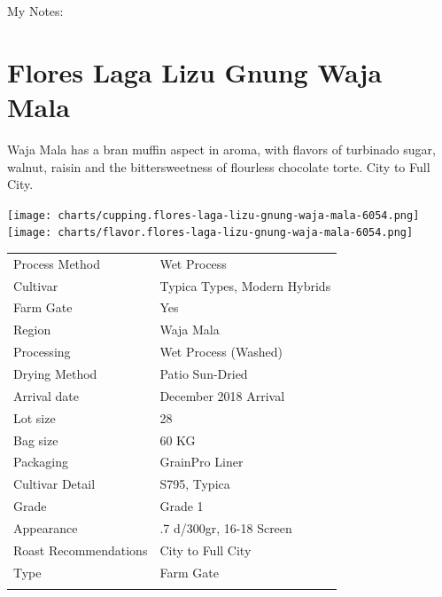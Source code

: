 \documentclass[10pt,twoside,footinclude=true,headinclude=true]{scrbook} %
\newlength{\mysize}
\newcommand{\myfontsize}[1]{
  \setlength{\mysize}{#1pt}
  \fontsize{\mysize}{1.2\mysize}
  \selectfont
}
\begin{document}
\medskip
\normalsize
My Notes:


\chapter*{Flores Laga Lizu Gnung Waja Mala}
 
\begin{addmargin}[2.2em]{2.2em}
\small
\justify
Waja Mala has a bran muffin aspect in aroma, with flavors of turbinado sugar, walnut, raisin and the bittersweetness of flourless chocolate torte. City to Full City.
\end{addmargin}

\centering
\vspace{2em}
\texttt{[image: charts/cupping.flores-laga-lizu-gnung-waja-mala-6054.png]}
\texttt{[image: charts/flavor.flores-laga-lizu-gnung-waja-mala-6054.png]}

\vspace{1em}
\begin{table}[htbp]
\myfontsize{7}
\hspace*{2.2em}
\begin{tabular}{ >{\raggedleft\arraybackslash}p{3.6cm}!{\color{lightgray}\vrule}p{7cm} }
\hline
  Process Method & Wet Process \\
  \hline
  Cultivar & Typica Types, Modern Hybrids \\
  \hline
  Farm Gate & Yes \\
  \hline
  Region & Waja Mala \\
  \hline
  Processing & Wet Process (Washed) \\
  \hline
  Drying Method & Patio Sun-Dried \\
  \hline
  Arrival date & December 2018 Arrival \\
  \hline
  Lot size & 28 \\
  \hline
  Bag size & 60 KG \\
  \hline
  Packaging & GrainPro Liner \\
  \hline
  Cultivar Detail & S795, Typica \\
  \hline
  Grade & Grade 1 \\
  \hline
  Appearance & .7 d/300gr, 16-18 Screen \\
  \hline
  Roast Recommendations & City to Full City \\
  \hline
  Type & Farm Gate \\
  \hline

\end{tabular}
\end{table}
\end{document}
